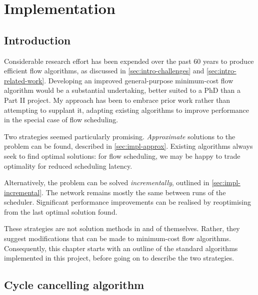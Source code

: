 \chapter{Implementation} \label{chap:impl}


\section{Introduction}

Considerable research effort has been expended over the past 60 years to produce efficient flow algorithms, as discussed in \cref{sec:intro-challenges} and \cref{sec:intro-related-work}. Developing an improved general-purpose minimum-cost flow algorithm would be a substantial undertaking, better suited to a PhD than a Part II project. My approach has been to embrace prior work rather than attempting to supplant it, adapting existing algorithms to improve performance in the special case of flow scheduling.

Two strategies seemed particularly promising. \emph{Approximate} solutions to the problem can be found, described in \cref{sec:impl-approx}. Existing algorithms always seek to find optimal solutions: for flow scheduling, we may be happy to trade optimality for reduced scheduling latency. 

Alternatively, the problem can be solved \emph{incrementally}, outlined in \cref{sec:impl-incremental}. The network remains mostly the same between runs of the scheduler. Significant performance improvements can be realised by reoptimising from the last optimal solution found.

These strategies are not solution methods in and of themselves. Rather, they suggest modifications that can be made to minimum-cost flow algorithms. Consequently, this chapter starts with an outline of the standard algorithms implemented in this project, before going on to describe the two strategies.


\section{Cycle cancelling algorithm} \label{sec:impl-cycle-cancelling}


